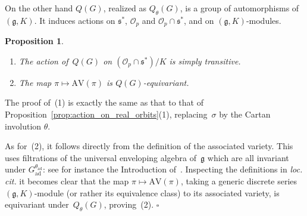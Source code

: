 \documentclass[10pt,leqno]{article}
\newtheorem{proposition}[equation]{Proposition}
\numberwithin{equation}{section}
\newcommand{\qed}{\hfill $\square$ \medskip}
\newcommand{\kernel}{\mathrm{kernel}}
\newcommand{\ad}{\mathrm{ad}}
\newcommand{\Gad}{G_\mathrm{ad}}
\newcommand{\Stab}{\mathrm{Stab}}
\renewcommand{\O}{\mathcal O}
\newcommand{\R}{\mathbb R}
\newcommand{\g}{\mathfrak g}
\newcommand{\s}{\mathfrak s}
\newcommand{\AV}{\mathrm{AV}}
\newcommand{\Op}{\O_p}
\begin{document}

On the other hand $Q(G)$, realized as $Q_\theta(G)$, is a group of automorphisms of $(\g,K)$.
It induces actions on $\s^*$, $\Op$ and $\Op\cap\s^*$, and on $(\g,K)$-modules.

\begin{proposition}\label{prop:action_on_K_orbits}
\begin{enumerate} 
\item The action of~$Q(G)$ on $(\Op \cap \s^*)/K$ is simply transitive.
\item The map $\pi \mapsto \AV(\pi)$ is $Q(G)$-equivariant.
\end{enumerate}
\end{proposition}

The proof of~(1) is exactly the same as that  to that of Proposition~\ref{prop:action_on_real_orbits}(1), replacing~$\sigma$ by the Cartan involution $\theta$.

As for~(2), it follows directly from the definition of the associated variety. This uses filtrations of the universal enveloping algebra of~$\g$ which are all invariant under $\Gad^{\theta_{\ad}}$: see for instance the Introduction of~\cite{vogan_bowdoin}. Inspecting the definitions in \emph{loc. cit.} it becomes clear that the map $\pi \mapsto \AV(\pi)$, taking a generic discrete series $(\g,K)$-module  (or rather its equivalence class) to its associated variety, is equivariant under~$Q_{\theta}(G)$, proving~(2). 
\qed
\end{document}
